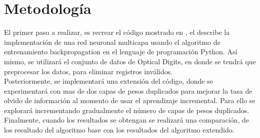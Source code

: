 \section{Metodología}
	
	
    El primer paso a realizar, es recrear el código mostrado en \cite{bullinaria2009}, el describe la implementación de una red neuronal multicapa usando el algoritmo de entrenamiento backpropagation en el lenguaje de programación Python. 
    Así mismo, se utilizará el conjunto de datos de Optical Digits, en donde se tendrá que preprocesar los datos, para eliminar registros inválidos.\\
    
    Posteriormente, se implementará una extensi\'on del código, donde se experimentará con mas de dos capas de pesos duplicados para mejorar la tasa de olvido de información al momento de usar el aprendizaje incremental.  Para ello se explorará incrementando gradualmente el n\'umero de capas de pesos duplicados.\\
    
    Finalmente, cuando los resultados se obtengan se realizar\'a una comparación, de los resultado del algoritmo base con los resultados del algoritmo extendido.
    



